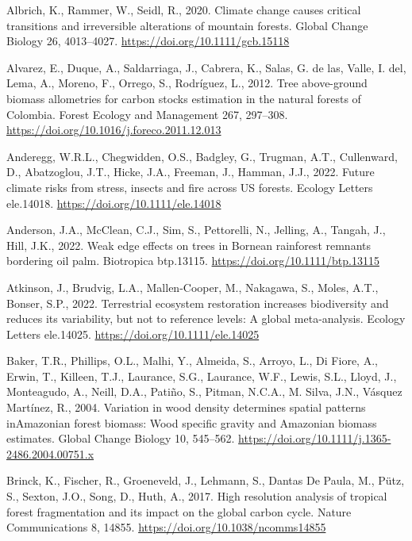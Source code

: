 \documentclass[
  12pt,
]{article}
\newlength{\cslhangindent}
\newlength{\cslentryspacingunit} %
\newenvironment{CSLReferences}[2] %
 {%
  \setlength{\parindent}{0pt}
  \ifodd #1
  \let\oldpar\par
  \def\par{\hangindent=\cslhangindent\oldpar}
  \fi
  \setlength{\parskip}{#2\cslentryspacingunit}
 }%
 {}
\begin{document}
\hypertarget{refs}{}
\begin{CSLReferences}{1}{0}
\leavevmode{}%
Albrich, K., Rammer, W., Seidl, R., 2020. Climate change causes critical transitions and irreversible alterations of mountain forests. Global Change Biology 26, 4013--4027. \url{https://doi.org/10.1111/gcb.15118}

\leavevmode{}%
Alvarez, E., Duque, A., Saldarriaga, J., Cabrera, K., Salas, G. de las, Valle, I. del, Lema, A., Moreno, F., Orrego, S., Rodríguez, L., 2012. Tree above-ground biomass allometries for carbon stocks estimation in the natural forests of {Colombia}. Forest Ecology and Management 267, 297--308. \url{https://doi.org/10.1016/j.foreco.2011.12.013}

\leavevmode{}%
Anderegg, W.R.L., Chegwidden, O.S., Badgley, G., Trugman, A.T., Cullenward, D., Abatzoglou, J.T., Hicke, J.A., Freeman, J., Hamman, J.J., 2022. Future climate risks from stress, insects and fire across {US} forests. Ecology Letters ele.14018. \url{https://doi.org/10.1111/ele.14018}

\leavevmode{}%
Anderson, J.A., McClean, C.J., Sim, S., Pettorelli, N., Jelling, A., Tangah, J., Hill, J.K., 2022. Weak edge effects on trees in {Bornean} rainforest remnants bordering oil palm. Biotropica btp.13115. \url{https://doi.org/10.1111/btp.13115}

\leavevmode{}%
Atkinson, J., Brudvig, L.A., Mallen-Cooper, M., Nakagawa, S., Moles, A.T., Bonser, S.P., 2022. Terrestrial ecosystem restoration increases biodiversity and reduces its variability, but not to reference levels: {A} global meta-analysis. Ecology Letters ele.14025. \url{https://doi.org/10.1111/ele.14025}

\leavevmode{}%
Baker, T.R., Phillips, O.L., Malhi, Y., Almeida, S., Arroyo, L., Di Fiore, A., Erwin, T., Killeen, T.J., Laurance, S.G., Laurance, W.F., Lewis, S.L., Lloyd, J., Monteagudo, A., Neill, D.A., Patiño, S., Pitman, N.C.A., M. Silva, J.N., Vásquez Martínez, R., 2004. Variation in wood density determines spatial patterns {inAmazonian} forest biomass: {Wood} specific gravity and {Amazonian} biomass estimates. Global Change Biology 10, 545--562. \url{https://doi.org/10.1111/j.1365-2486.2004.00751.x}

\leavevmode{}%
Brinck, K., Fischer, R., Groeneveld, J., Lehmann, S., Dantas De Paula, M., Pütz, S., Sexton, J.O., Song, D., Huth, A., 2017. High resolution analysis of tropical forest fragmentation and its impact on the global carbon cycle. Nature Communications 8, 14855. \url{https://doi.org/10.1038/ncomms14855}


\end{CSLReferences}
\end{document}
